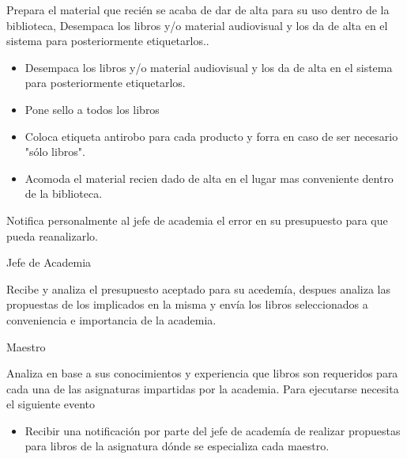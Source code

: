 \begin{PDescripcion}
\begin{enumerate}
	\Ppaso[\itarea] Prepara el material que recién se acaba de dar de alta para su uso dentro de la biblioteca, Desempaca los libros y/o material audiovisual y los da de alta en el sistema para posteriormente etiquetarlos..
	
	\begin{itemize}
	  \item Desempaca los libros y/o material audiovisual y los da de alta en el sistema para posteriormente etiquetarlos.
	  \item Pone sello a todos los libros
	  \item Coloca etiqueta antirobo para cada producto  y forra en caso de ser necesario "sólo libros".
	  \item Acomoda el material recien dado de alta en el lugar mas conveniente dentro de la biblioteca.
	 \end{itemize}
	 
	 \Ppaso[\itarea] Notifica personalmente al jefe de academia el error en su presupuesto para que pueda reanalizarlo.
	

    \end{enumerate}

  \Ppaso Jefe de Academia

    \begin{enumerate}

      \Ppaso[\itarea]  Recibe y analiza el presupuesto aceptado para su acedemía, despues analiza las propuestas de los   implicados en la misma y envía los libros seleccionados a conveniencia e importancia de la academia.


    \end{enumerate}
    
  \Ppaso Maestro

    \begin{enumerate}

      \Ppaso[\itarea]  Analiza en base a sus conocimientos y experiencia que libros son requeridos para cada una de las asignaturas impartidas por la academia. Para ejecutarse necesita el siguiente evento
      \begin{itemize}
      \item Recibir una notificación por parte del jefe de academía de realizar propuestas para libros de la asignatura dónde se especializa cada maestro.
      \end{itemize}



\end{enumerate}
\end{PDescripcion}
